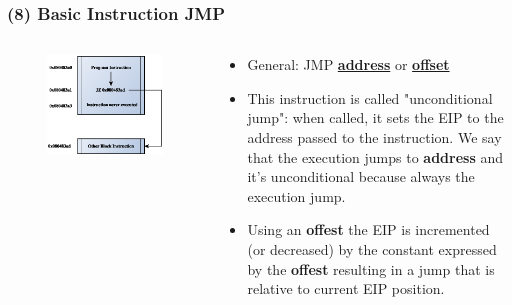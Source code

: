 \documentclass[]{beamer}
\begin{document}
		\begin{frame}
			\frametitle{(8) Basic Instruction JMP}
				\begin{columns}
					\begin{column}{0.4\columnwidth}
						\begin{figure}
							\includegraphics[width=1.2\textwidth]{images/jmp.eps}
							
							\label{Control Flow JMP}
						\end{figure}
					\end{column}
					\begin{column}{0.6\columnwidth}
						\begin{itemize}	
							\item{General: JMP \underline{\textbf{address}} or \underline{\textbf{offset}}}\\

							\item{This instruction is called "unconditional jump": when called, it sets the EIP to the address passed to the instruction. We say that the execution jumps to \textbf{address} and it's unconditional because always the execution jump.}
							\item{Using an \textbf{offest} the EIP is incremented (or decreased) by the constant expressed by the \textbf{offest} resulting in a jump that is relative to current EIP position.}
						\end{itemize}

					\end{column}
				\end{columns}
		\end{frame}
\end{document}
